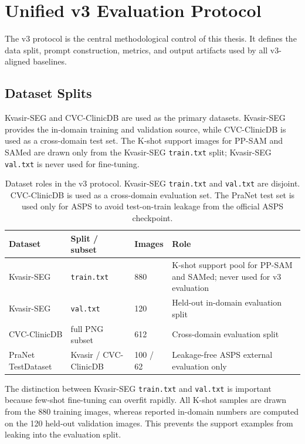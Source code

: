 \section{Unified v3 Evaluation Protocol}
\label{sec:v3-protocol}

The v3 protocol is the central methodological control of this thesis. It defines the data split, prompt construction, metrics, and output artifacts used by all v3-aligned baselines.

\subsection{Dataset Splits}
\label{sec:dataset-splits}

Kvasir-SEG and CVC-ClinicDB are used as the primary datasets. Kvasir-SEG provides the in-domain training and validation source, while CVC-ClinicDB is used as a cross-domain test set. The K-shot support images for PP-SAM and SAMed are drawn only from the Kvasir-SEG \texttt{train.txt} split; Kvasir-SEG \texttt{val.txt} is never used for fine-tuning.

\begin{table}[H]
\centering
\caption{Dataset roles in the v3 protocol. Kvasir-SEG \texttt{train.txt} and \texttt{val.txt} are disjoint. CVC-ClinicDB is used as a cross-domain evaluation set. The PraNet test set is used only for ASPS to avoid test-on-train leakage from the official ASPS checkpoint.}
\label{tab:dataset-splits}
\begin{tabular}{p{3.2cm}p{3.1cm}p{2.4cm}p{5.3cm}}
\toprule
\textbf{Dataset} & \textbf{Split / subset} & \textbf{Images} & \textbf{Role} \\
\midrule
Kvasir-SEG & \texttt{train.txt} & 880 & K-shot support pool for PP-SAM and SAMed; never used for v3 evaluation \\
Kvasir-SEG & \texttt{val.txt} & 120 & Held-out in-domain evaluation split \\
CVC-ClinicDB & full PNG subset & 612 & Cross-domain evaluation split \\
PraNet TestDataset & Kvasir / CVC-ClinicDB & 100 / 62 & Leakage-free ASPS external evaluation only \\
\bottomrule
\end{tabular}
\end{table}

The distinction between Kvasir-SEG \texttt{train.txt} and \texttt{val.txt} is important because few-shot fine-tuning can overfit rapidly. All K-shot samples are drawn from the 880 training images, whereas reported in-domain numbers are computed on the 120 held-out validation images. This prevents the support examples from leaking into the evaluation split.

